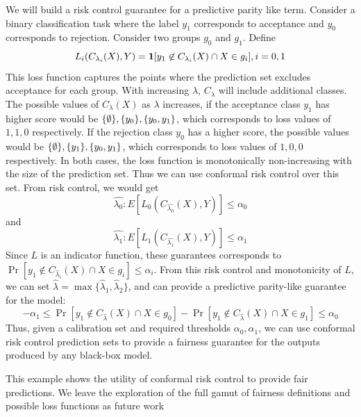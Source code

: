 We will build a risk control guarantee for a predictive parity like term.
Consider a binary classification task where the label $y_1$ corresponds to acceptance and $y_0$ corresponds to rejection.
Consider two groups $g_0$ and $g_1$.
Define 
\[
    L_i(C_{\lambda_i}(X), Y) = \bm{1}[y_1 \not\in C_{\lambda_i}(X) \cap X \in g_i], i = 0, 1
\]
This loss function captures the points where the prediction set excludes acceptance for each group.
With increasing $\lambda$, $C_\lambda$ will include additional classes.
The possible values of $C_\lambda(X)$ as $\lambda$ increases, if the acceptance class $y_1$ has higher score would be $\{\emptyset\}, \{y_0\}, \{y_0, y_1\}$, which corresponds to loss values of $1, 1, 0$ respectively.
If the rejection class $y_0$ has a higher score, the possible values would be $\{\emptyset\}, \{y_1\}, \{y_0, y_1\}$, which corresponds to loss values of $1, 0, 0$ respectively.
In both cases, the loss function is monotonically non-increasing with the size of the prediction set.
Thus we can use conformal risk control over this set.
From risk control, we would get 
\[
    \hat{\lambda_0} : E[L_0(C_{\hat{\lambda_0}}(X), Y)] \leq \alpha_0
\]
and 
\[
    \hat{\lambda_1} : E[L_1(C_{\hat{\lambda_1}}(X), Y)] \leq \alpha_1
\]
Since $L$ is an indicator function, these guarantees corresponds to $\Pr[y_1 \not\in C_{\hat{\lambda}_i}(X) \cap X \in g_i] \leq \alpha_i$.
From this risk control and monotonicity of $L$, we can set $\hat{\lambda} = \max\{\hat{\lambda}_1, \hat{\lambda}_2\}$, and can provide a predictive parity-like guarantee for the model:
\[
    -\alpha_1 \leq \Pr[y_1 \not\in C_{\hat{\lambda}}(X) \cap X \in g_0] - \Pr[y_1 \not\in C_{\hat{\lambda}}(X) \cap X \in g_1] \leq \alpha_0
\]
Thus, given a calibration set and required thresholds $\alpha_0, \alpha_1$, we can use conformal risk control prediction sets to provide a fairness guarantee for the outputs produced by any black-box model.

This example shows the utility of conformal risk control to provide fair predictions.
We leave the exploration of the full gamut of fairness definitions and possible loss functions as future work

